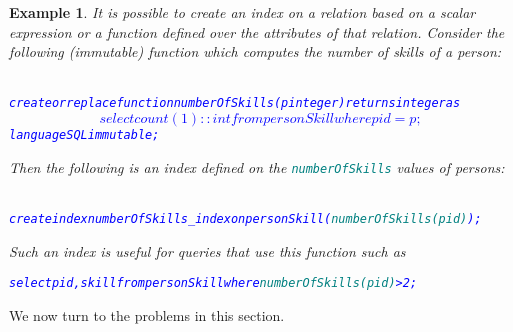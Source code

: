 \documentclass{article}
\newtheorem{example}{Example}
\begin{document}
\begin{example}
It is possible to create an index on a relation based on a \emph{scalar expression} or a \emph{function} defined over the attributes
of that relation.    Consider the following (immutable) function which computes the number of skills of a person:
{\small
\begin{alltt}
\textcolor{blue}{
create or replace function numberOfSkills(p integer) returns integer as
$$
    select count(1)::int 
    from   personSkill 
    where  pid = p;
$$ language SQL immutable;}
\end{alltt}
}                                                                                                  
Then the following is an index defined on the \textcolor{teal}{\tt numberOfSkills} values of persons:
{\small
\begin{alltt}
\textcolor{blue}{
create index numberOfSkills_index on personSkill (\textcolor{teal}{numberOfSkills(pid)});}
\end{alltt}
Such an index is useful for queries that use this function such as
\begin{alltt}
\textcolor{blue}{select pid, skill from personSkill where \textcolor{teal}{numberOfSkills(pid)} > 2;}
\end{alltt}
}
\end{example}




We now turn to the problems in this section.
\end{document}

